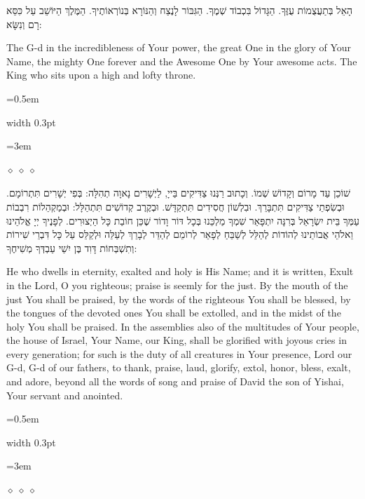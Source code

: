 \documentclass[11pt, openany]{book}
\newlength{\bidiHebWidth}
\newlength{\bidiEngWidth}
\newenvironment{bilingual}{%
  \par\vspace{4pt}%
}{%
  \noindent
  \begin{minipage}[t]{\bidiEngWidth}
    \setstretch{1.4}\emergencystretch=0.5em\normalsize
    \usebox{\bidiEngBox}
  \end{minipage}%
  \hfill
  {\color{sedergold}\vrule width 0.3pt}%
  \hfill
  \begin{minipage}[t]{\bidiHebWidth}
    \begingroup\hebrewfont\TeXXeTstate=1\beginR
    \large\setstretch{1.4}\emergencystretch=3em\tolerance=9999\parindent=0pt\relax
    \usebox{\bidiHebBox}
    \endR\endgroup
  \end{minipage}%
  \par\vspace{2pt}%
}
\newenvironment{hebrewcol}{%
  \begin{lrbox}{\bidiHebBox}\begin{minipage}{\bidiHebWidth}%
}{%
  \end{minipage}\end{lrbox}%
}
\newenvironment{englishcol}{%
  \begin{lrbox}{\bidiEngBox}\begin{minipage}{\bidiEngWidth}%
}{%
  \end{minipage}\end{lrbox}%
}
\newcommand{\parasep}{%
  \par\vspace{3pt}
  \begin{center}
    \textcolor{sedergold!50}{\tiny$\diamond\;\diamond\;\diamond$}
  \end{center}
  \par\vspace{3pt}
}
\begin{document}
\begin{bilingual}
\begin{hebrewcol}
הָאֵל בְּתַעֲצֻמוֹת עֻזֶּךָ. הַגָּדוֹל בִּכְבוֹד שְׁמֶךָ. הַגִּבּוֹר לָנֶצַח וְהַנּוֹרָא בְּנוֹרְאוֹתֶיךָ. הַמֶּלֶךְ הַיּוֹשֵׁב עַל כִּסֵּא רָם וְנִשָּׂא:
\end{hebrewcol}
\begin{englishcol}
The G-d in the incredibleness of Your power, the great One in the glory of Your Name, the mighty One forever and the Awesome One by Your awesome acts. The King who sits upon a high and lofty throne.
\end{englishcol}
\end{bilingual}
\parasep

\begin{bilingual}
\begin{hebrewcol}
שׁוֹכֵן עַד מָרוֹם וְקָדוֹשׁ שְׁמוֹ. וְכָתוּב רַנְּנוּ צַדִּיקִים בַּייָ, לַיְשָׁרִים נָאוָה תְהִלָּה: בְּפִי יְשָׁרִים תִּתְרוֹמָם. וּבְשִׂפְתֵי צַדִּיקִים תִּתְבָּרֵךְ. וּבִלְשׁוֹן חֲסִידִים תִּתְקַדָּשׁ. וּבְקֶרֶב קְדוֹשִׁים תִּתְהַלָּל: וּבְמַקְהֵלוֹת רִבְבוֹת עַמְּךָ בֵּית יִשְׂרָאֵל בְּרִנָּה יִתְפָּאֵר שִׁמְךָ מַלְכֵּנוּ בְּכָל דּוֹר וָדוֹר שֶׁכֵּן חוֹבַת כָּל הַיְצוּרִים. לְפָנֶיךָ יְיָ אֱלֹהֵינוּ וֵאלֹהֵי אֲבוֹתֵינוּ לְהוֹדוֹת לְהַלֵּל לְשַׁבֵּחַ לְפָאֵר לְרוֹמֵם לְהַדֵּר לְבָרֵךְ לְעַלֵּה וּלְקַלֵּס עַל כָּל דִּבְרֵי שִׁירוֹת וְתִשְׁבְּחוֹת דָּוִד בֶּן יִשַׁי עַבְדְּךָ מְשִׁיחֶךָ:
\end{hebrewcol}
\begin{englishcol}
He who dwells in eternity, exalted and holy is His Name; and it is written, Exult in the Lord, O you righteous; praise is seemly for the just. By the mouth of the just You shall be praised, by the words of the righteous You shall be blessed, by the tongues of the devoted ones You shall be extolled, and in the midst of the holy You shall be praised. In the assemblies also of the multitudes of Your people, the house of Israel, Your Name, our King, shall be glorified with joyous cries in every generation; for such is the duty of all creatures in Your presence, Lord our G-d, G-d of our fathers, to thank, praise, laud, glorify, extol, honor, bless, exalt, and adore, beyond all the words of song and praise of David the son of Yishai, Your servant and anointed.
\end{englishcol}
\end{bilingual}
\parasep
\end{document}
